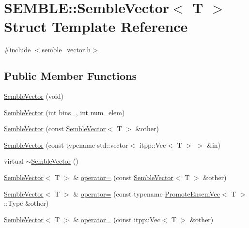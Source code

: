 \hypertarget{structSEMBLE_1_1SembleVector}{}\section{S\+E\+M\+B\+LE\+:\+:Semble\+Vector$<$ T $>$ Struct Template Reference}
\label{structSEMBLE_1_1SembleVector}


{\ttfamily \#include $<$semble\+\_\+vector.\+h$>$}

\subsection*{Public Member Functions}
\begin{DoxyCompactItemize}
\item 
\mbox{\hyperlink{structSEMBLE_1_1SembleVector_a71d201a7d5b2a62cea4034074fa210f5}{Semble\+Vector}} (void)
\item 
\mbox{\hyperlink{structSEMBLE_1_1SembleVector_a84340fccafe642a4754727fbc95e6356}{Semble\+Vector}} (int bins\+\_\+, int num\+\_\+elem)
\item 
\mbox{\hyperlink{structSEMBLE_1_1SembleVector_a929ee26afcab4cb287ad02440bb6bde2}{Semble\+Vector}} (const \mbox{\hyperlink{structSEMBLE_1_1SembleVector}{Semble\+Vector}}$<$ T $>$ \&other)
\item 
\mbox{\hyperlink{structSEMBLE_1_1SembleVector_a68bd844cdccf381b1445e91c7ad85d6b}{Semble\+Vector}} (const typename std\+::vector$<$ itpp\+::\+Vec$<$ T $>$ $>$ \&in)
\item 
virtual \mbox{\hyperlink{structSEMBLE_1_1SembleVector_a83ec44fd47877096d8d8ce645a3fb820}{$\sim$\+Semble\+Vector}} ()
\item 
\mbox{\hyperlink{structSEMBLE_1_1SembleVector}{Semble\+Vector}}$<$ T $>$ \& \mbox{\hyperlink{structSEMBLE_1_1SembleVector_ab6872005fc4c6dae0da5832e49f15efb}{operator=}} (const \mbox{\hyperlink{structSEMBLE_1_1SembleVector}{Semble\+Vector}}$<$ T $>$ \&other)
\item 
\mbox{\hyperlink{structSEMBLE_1_1SembleVector}{Semble\+Vector}}$<$ T $>$ \& \mbox{\hyperlink{structSEMBLE_1_1SembleVector_a77509266a73ada965ab9b6a598922a75}{operator=}} (const typename \mbox{\hyperlink{structSEMBLE_1_1PromoteEnsemVec}{Promote\+Ensem\+Vec}}$<$ T $>$\+::Type \&other)
\item 
\mbox{\hyperlink{structSEMBLE_1_1SembleVector}{Semble\+Vector}}$<$ T $>$ \& \mbox{\hyperlink{structSEMBLE_1_1SembleVector_a50a55ed098c6c03398f61e904f88f700}{operator=}} (const itpp\+::\+Vec$<$ T $>$ \&other)

\end{DoxyCompactItemize}
